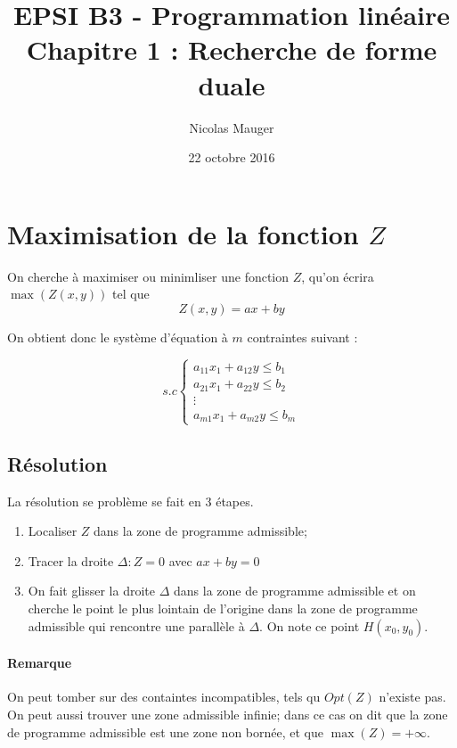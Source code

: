 



\title{EPSI B3 - Programmation linéaire\\Chapitre 1 : Recherche de forme duale}

\author{Nicolas Mauger}

\date{22 octobre 2016}

\maketitle

\section{Maximisation de la fonction $Z$}
On cherche à maximiser ou minimliser une fonction $Z$, qu'on écrira
$\max(Z(x,y))$ tel que $$Z(x,y) = ax + by$$

On obtient donc le système d'équation à $m$ contraintes suivant :

\begin{equation*}
  s.c
     \begin{cases}
        a_{11}x_{1} + a_{12}y \leq b_{1} \\
        a_{21}x_{1} + a_{22}y \leq b_{2} \\
        \vdots                           \\
        a_{m1}x_{1} + a_{m2}y \leq b_{m}
     \end{cases}
\end{equation*}

\subsection{Résolution}
La résolution se problème se fait en 3 étapes.
\begin{enumerate}
  \item Localiser $Z$ dans la zone de programme admissible;
  \item Tracer la droite $ \Delta : Z = 0 $ avec $ax+by=0$
  \item On fait glisser la droite $\Delta$ dans la zone de programme admissible
  et on cherche le point le plus lointain de l'origine dans la zone de programme
  admissible qui rencontre une parallèle à $\Delta$. On note ce point
  $H(x_{0},y_{0})$.
\end{enumerate}

\paragraph{Remarque}
On peut tomber sur des containtes incompatibles, tels qu $Opt(Z)$ n'existe pas. \\
On peut aussi trouver une zone admissible infinie; dans ce cas on dit que la
zone de programme admissible est une zone non bornée, et que $\max(Z)=+\infty$.

